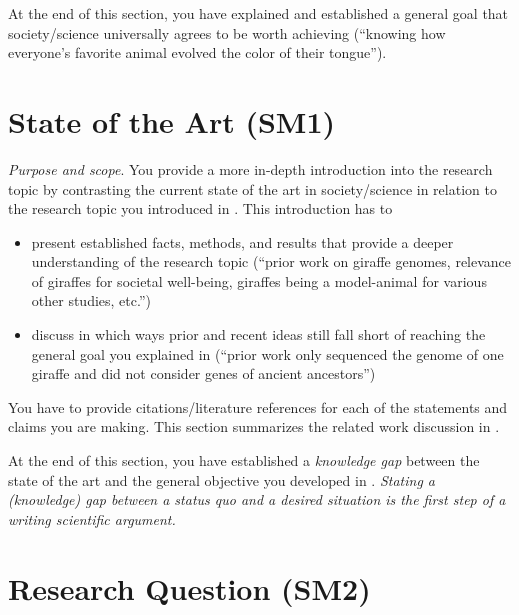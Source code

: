 At the end of this section, you have explained and established a general goal that society/science universally agrees to be worth achieving (``knowing how everyone's favorite animal evolved the color of their tongue'').

\section{State of the Art (SM1)}\label{sec:introduction:state-of-art}

\emph{Purpose and scope}.
You provide a more in-depth introduction into the research topic by contrasting the current state of the art in society/science in relation to the research topic you introduced in .
This introduction has to

\begin{itemize}
  \item present established facts, methods, and results that provide a deeper understanding of the research topic (``prior work on giraffe genomes, relevance of giraffes for societal well-being, giraffes being a model-animal for various other studies, etc.'')
  \item discuss in which ways prior and recent ideas still fall short of reaching the general goal you explained in  (``prior work only sequenced the genome of one giraffe and did not consider genes of ancient ancestors'')
\end{itemize}

You have to provide citations/literature references for each of the statements and claims you are making.
This section summarizes the related work discussion in .

At the end of this section, you have established a \emph{knowledge gap} between the state of the art and the general objective you developed in .
\emph{Stating a (knowledge) gap between a status quo and a desired situation is the \emph{first step} of a writing scientific argument.}

\section{Research Question (SM2)}\label{sec:introduction:research-question}

